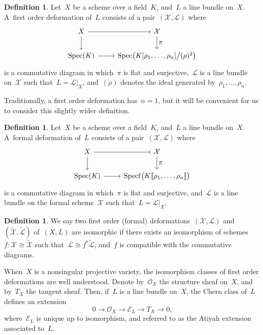 \documentclass[10pt,a4paper]{article}
\numberwithin{equation}{section}
\let\ts\textstyle
\theoremstyle{plain}
\theoremstyle{definition}
\newtheorem{definition}[theoremcounter]{Definition}
\newcommand{\tx}{\text}
\newcommand{\cE}{\ensuremath{\mathcal{E}}}
\newcommand{\cL}{\ensuremath{\mathcal{L}}}
\newcommand{\cO}{\ensuremath{\mathcal{O}}}
\newcommand{\cX}{\ensuremath{\mathcal{X}}}
\let\wtd\widetilde
\newcommand{\llbrkt}{[\![}
\newcommand{\rrbrkt}{]\!]}
\DeclareMathOperator{\Spec}{Spec}
\DeclareMathOperator{\Specf}{Specf}
\begin{document}
\begin{definition}
\label{def:first_order_deformation_line_bundle}
Let~$X$ be a scheme over a field~$K$, and~$L$ a line bundle on~$X$. A~first order deformation of~$L$ consists of a pair~$(\cX,\cL)$ where
\[
\begin{tikzcd}
X\arrow[r] \arrow[d]& \cX\arrow[d,"\ts\pi"]\\
\Spec(K) \arrow[r]& \Spec\bigl(K[\rho_1,\ldots,\rho_n] \big/ (\rho)^2 \bigr)
\end{tikzcd}
\]
is a commutative diagram in which~$\pi$ is flat and surjective,~$\cL$ is a line bundle on~$\cX$ such that~$L=\cL|_X$, and~$(\rho)$ denotes the ideal generated by~$\rho_1,\ldots,\rho_n$.
\end{definition}

Traditionally, a first order deformation has~$n=1$, but it will be convenient for us to consider this slightly wider definition.

\begin{definition}
\label{def:formal_deformation_line_bundle}
Let~$X$ be a scheme over a field~$K$, and~$L$ a line bundle on~$X$. A~formal deformation of~$L$ consists of a pair~$(\cX,\cL)$ where
\[
\begin{tikzcd}
X\arrow[r] \arrow[d]& \cX\arrow[d,"\ts\pi"]\\
\Spec(K) \arrow[r]& \Specf\bigl(K\llbrkt \rho_1,\ldots,\rho_n \rrbrkt \bigr)
\end{tikzcd}
\]
is a commutative diagram in which~$\pi$ is flat and surjective, and~$\cL$ is a line bundle on the formal scheme~$\cX$ such that~$L=\cL|_X$.
\end{definition}

\begin{definition}
\label{def:deformation_isomorphism}
We say two first order (formal) deformations~$(\cX,\cL)$ and~$(\wtd{\cX},\wtd{\cL})$ of~$(X,L)$ are isomorphic if there exists an isomorphism of schemes~$f:\cX\cong\wtd{\cX}$ such that~$\cL\cong f^*\wtd{\cL}$, and~$f$ is compatible with the commutative diagrams.
\end{definition}

When~$X$ is a nonsingular projective variety, the isomorphism classes of first order deformations are well understood. Denote by~$\cO_X$ the structure sheaf on~$X$, and by~$T_X$ the tangent sheaf. Then, if~$L$ is a line bundle on~$X$, the Chern class of~$L$ defines an extension
\begin{equation*}
0 \to \cO_X \to \cE_L \to T_X \to 0
\tx{,}
\end{equation*}
where~$\cE_L$ is unique up to isomorphism, and referred to as the Atiyah extension associated to~$L$.
\end{document}
